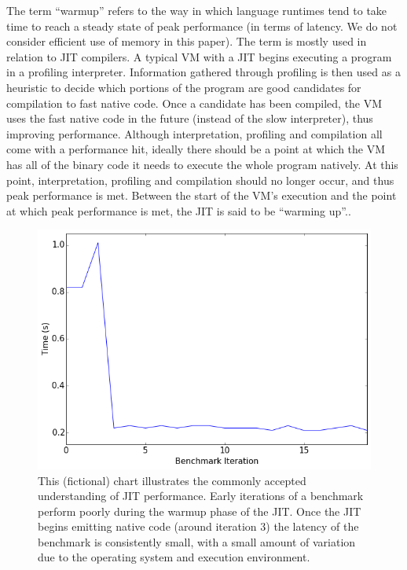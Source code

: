 \documentclass[10pt,preprint]{sigplanconf}
\begin{document}
The term ``warmup'' refers to the way in which language runtimes tend to take
time to reach a steady state of peak performance (in terms of latency. We do
not consider efficient use of memory in this paper).  The term is mostly used
in relation to JIT compilers. A typical VM
with a JIT begins executing a program in a profiling interpreter. Information
gathered through profiling is then used as a heuristic to decide which portions
of the program are good candidates for compilation to fast native code. Once a
candidate has been compiled, the VM uses the fast native code in the future
(instead of the slow interpreter), thus improving performance.  Although
interpretation, profiling and compilation all come with a performance hit,
ideally there should be a point at which the VM has all of the binary code it
needs to execute the whole program natively. At this point, interpretation,
profiling and compilation should no longer occur, and thus peak performance is
met. Between the start of the VM's execution and the point at which peak
performance is met, the JIT is said to be ``warming up''..

\begin{figure}[h!]
\centering
\includegraphics[width=.4\textwidth]{img/trad}
\caption{ This (fictional) chart illustrates the commonly accepted understanding
of JIT performance. Early iterations of a benchmark perform poorly during the
warmup phase of the JIT. Once the JIT begins emitting native code (around
iteration 3) the latency of the benchmark is consistently small, with a small
amount of variation due to the operating system and execution environment.}
\label{fig:trad}
\end{figure}
\end{document}

